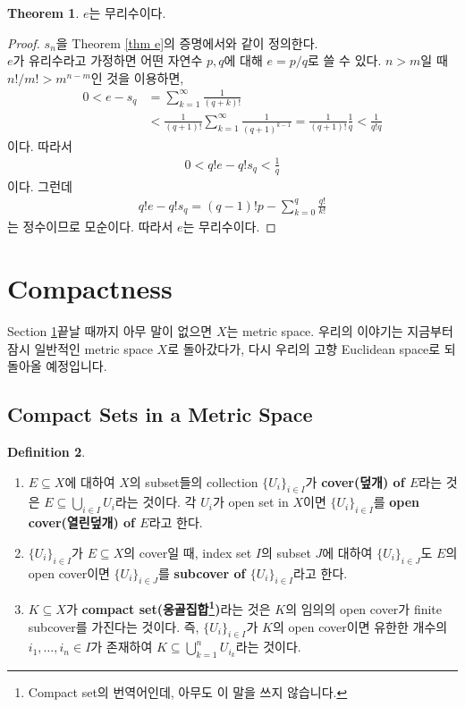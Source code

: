 \documentclass[12pt]{article}
\theoremstyle{definition}
\newtheorem{thm}{Theorem}[section]
\newtheorem{defn}[thm]{Definition}
\begin{document}
\begin{thm}
	\(e\)는 무리수이다.
\end{thm}
\begin{proof}
	\(s_n\)을 Theorem \ref{thm e}의 증명에서와 같이 정의한다.\\
	\(e\)가 유리수라고 가정하면 어떤 자연수 \(p, q\)에 대해 \(e = p/q\)로 쓸 수 있다. \(n > m\)일 때 \(n!/m! > m^{n-m}\)인 것을 이용하면,
	\begin{align*}
		0 < e - s_q &= \sum_{k=1}^\infty \frac{1}{(q+k)!}\\
		&< \frac{1}{(q+1)!}\sum_{k=1}^\infty \frac{1}{(q+1)^{k-1}} = \frac{1}{(q+1)!} \frac{1}{q} < \frac{1}{q!q}
	\end{align*}
	이다. 따라서
	\begin{align*}
		0 < q!e - q!s_q < \frac{1}{q}
	\end{align*}
	이다. 그런데
	\begin{align*}
		q!e - q!s_q = (q-1)!p - \sum_{k=0}^q \frac{q!}{k!}
	\end{align*}
	는 정수이므로 모순이다. 따라서 \(e\)는 무리수이다.
\end{proof}

\newpage

\section{Compactness} \label{sec cpt}

Section \ref{sec cpt}\이 끝날 때까지 아무 말이 없으면 \(X\)는 metric space. 우리의 이야기는 지금부터 잠시 일반적인 metric space \(X\)로 돌아갔다가, 다시 우리의 고향 Euclidean space로 되돌아올 예정입니다.

\subsection{Compact Sets in a Metric Space}

	\begin{defn}
		\quad
		\begin{enumerate}[label=(\alph*), leftmargin=2\parindent]
			\item
			\(E \subseteq X\)에 대하여 \(X\)의 subset들의 collection \(\{U_i\}_{i \in I}\)가 \textbf{cover(덮개) of \(E\)}라는 것은 \(E \subseteq \bigcup_{i \in I} U_i\)라는 것이다. 각 \(U_i\)가 open set in \(X\)이면 \(\{U_i\}_{i \in I}\)를 \textbf{open cover(열린덮개) of \(E\)}라고 한다.
			\item
			\(\{U_i\}_{i \in I}\)가 \(E \subseteq X\)의 cover일 때, index set \(I\)의 subset \(J\)에 대하여 \(\{U_i\}_{i \in J}\)도 \(E\)의 open cover이면 \(\{U_i\}_{i \in J}\)를 \textbf{subcover of \(\{U_i\}_{i \in I}\)}라고 한다.
			\item
			\(K \subseteq X\)가 \textbf{compact set(옹골집합\footnote{Compact set의 번역어인데, 아무도 이 말을 쓰지 않습니다.})}라는 것은 \(K\)의 임의의 open cover가 finite subcover를 가진다는 것이다. 즉, \(\{U_i\}_{i \in I}\)가 \(K\)의 open cover이면 유한한 개수의 \(i_1, \ldots, i_n \in I\)가 존재하여 \(K \subseteq \bigcup_{k=1}^n U_{i_k}\)라는 것이다.
		\end{enumerate}	
	\end{defn}
\end{document}
